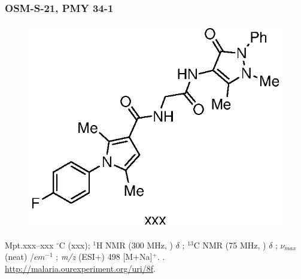 \documentclass[12pt, a4paper,titlepage]{article}
\begin{document}
{\subsubsection*{OSM-S-21, PMY 34-1}
\label{exp:PMY34}
	\begin{figure}[H]
	\begin{center}
	\includegraphics{exp/PMY34.eps}
	\end{center}
	\vspace{-25pt}	
	\end{figure}	

Mpt.xxx--xxx $^\circ$C (xxx); 
$^1$H NMR (300 MHz, ) $\delta$ ; 
  $^{13}$C NMR (75 MHz, ) $\delta$ ; 
 $\nu_{max}$ (neat) /$cm^{-1}$ ; 
\emph{m/z} (ESI+) 498 [M+Na]$^+$.
. 
\url{http://malaria.ourexperiment.org/uri/8f}. 




}
\end{document}
